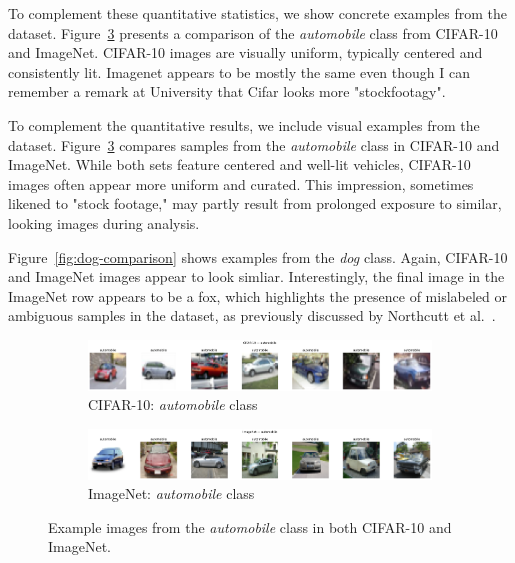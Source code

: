 To complement these quantitative statistics, we show concrete examples from the dataset. Figure~\ref{fig:automobile-comparison}
presents a comparison of the \textit{automobile} class from CIFAR-10 and ImageNet. CIFAR-10 images are visually uniform, typically centered and 
consistently lit. Imagenet appears to be mostly the same even though I can remember a remark at University that Cifar looks more "stockfootagy". 

To complement the quantitative results, we include visual examples from the dataset. Figure~\ref{fig:automobile-comparison} compares samples from the \textit{automobile} class in CIFAR-10 and ImageNet. While both sets feature centered and well-lit vehicles, CIFAR-10 images often appear more uniform and curated. This impression, sometimes likened to "stock footage," may partly result from prolonged exposure to similar, looking images during analysis.

Figure~\ref{fig:dog-comparison} shows examples from the \textit{dog} class. Again, CIFAR-10 
and ImageNet images appear to look simliar. Interestingly, the final image in the ImageNet row appears to be a 
fox, which highlights the presence of mislabeled or ambiguous samples in the dataset, as previously discussed by Northcutt et al.~\cite
{northcutt2021confident}.

\begin{figure}[H]
    \centering
    \begin{subfigure}[b]{\textwidth}
        \centering
        \includegraphics[width=\textwidth]{Plots/DatasetOverview/cifar_automobile_7_grid.pdf}
        \caption{CIFAR-10: \textit{automobile} class}
        \label{fig:cifar-automobile}
    \end{subfigure}

    \begin{subfigure}[b]{\textwidth}
        \centering
        \includegraphics[width=\textwidth]{Plots/DatasetOverview/imageNet_automobile_7_grid.pdf}
        \caption{ImageNet: \textit{automobile} class}
        \label{fig:imagenet-automobile}
    \end{subfigure}
    
    \caption{Example images from the \textit{automobile} class in both CIFAR-10 and ImageNet.}
    \label{fig:automobile-comparison}
\end{figure}


